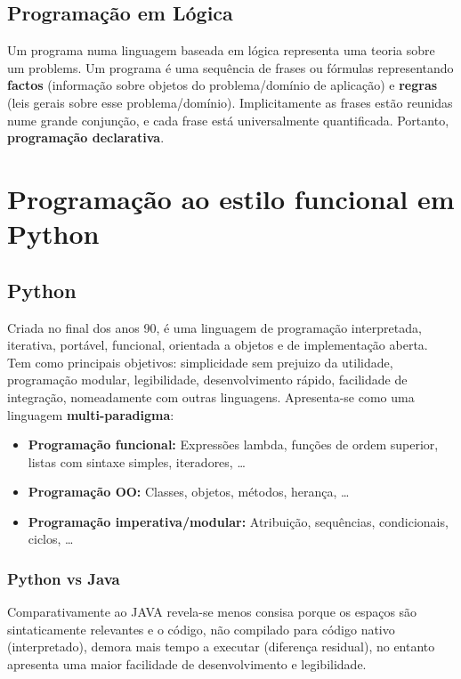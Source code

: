 \documentclass{article}
\begin{document}
\subsection{Programação em Lógica}

Um programa numa linguagem baseada em lógica representa uma teoria sobre um
problems. Um programa é uma sequência de frases ou fórmulas representando
\textbf{factos} (informação sobre objetos do problema/domínio de aplicação) e \textbf{regras}
(leis gerais sobre esse problema/domínio). Implicitamente as frases estão reunidas
nume grande conjunção, e cada frase está universalmente quantificada. Portanto,
\textbf{programação declarativa}.

\pagebreak

\section{Programação ao estilo funcional em Python}

\subsection{Python}

Criada no final dos anos 90, é uma linguagem de programação interpretada,
iterativa, portável, funcional, orientada a objetos e de implementação aberta.
Tem como principais objetivos: simplicidade sem prejuizo da utilidade,
programação modular, legibilidade, desenvolvimento rápido, facilidade de integração,
nomeadamente com outras linguagens. Apresenta-se como uma linguagem \textbf{multi-paradigma}:
\begin{itemize}
  \item \textbf{Programação funcional:} Expressões lambda, funções de ordem superior,
  listas com sintaxe simples, iteradores, \dots
  \item \textbf{Programação OO:} Classes, objetos, métodos, herança, \dots
  \item \textbf{Programação imperativa/modular:} Atribuição, sequências,
  condicionais, ciclos, \dots
\end{itemize}

\subsubsection{Python vs Java}

Comparativamente ao JAVA revela-se menos consisa porque os espaços são sintaticamente
relevantes e o código, não compilado para código nativo (interpretado), demora mais tempo a
executar (diferença residual), no entanto apresenta uma maior facilidade de desenvolvimento e
legibilidade.
\end{document}
